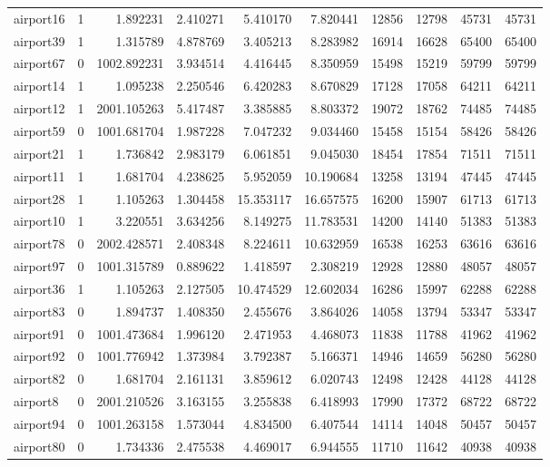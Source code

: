 \begin{longtable}{|l|r|r|r|r|r|r|r|r|r|}
airport16 & 1 & 1.892231 & 2.410271 & 5.410170 & 7.820441 & 12856 & 12798 & 45731 & 45731 \\
airport39 & 1 & 1.315789 & 4.878769 & 3.405213 & 8.283982 & 16914 & 16628 & 65400 & 65400 \\
airport67 & 0 & 1002.892231 & 3.934514 & 4.416445 & 8.350959 & 15498 & 15219 & 59799 & 59799 \\
airport14 & 1 & 1.095238 & 2.250546 & 6.420283 & 8.670829 & 17128 & 17058 & 64211 & 64211 \\
airport12 & 1 & 2001.105263 & 5.417487 & 3.385885 & 8.803372 & 19072 & 18762 & 74485 & 74485 \\
airport59 & 0 & 1001.681704 & 1.987228 & 7.047232 & 9.034460 & 15458 & 15154 & 58426 & 58426 \\
airport21 & 1 & 1.736842 & 2.983179 & 6.061851 & 9.045030 & 18454 & 17854 & 71511 & 71511 \\
airport11 & 1 & 1.681704 & 4.238625 & 5.952059 & 10.190684 & 13258 & 13194 & 47445 & 47445 \\
airport28 & 1 & 1.105263 & 1.304458 & 15.353117 & 16.657575 & 16200 & 15907 & 61713 & 61713 \\
airport10 & 1 & 3.220551 & 3.634256 & 8.149275 & 11.783531 & 14200 & 14140 & 51383 & 51383 \\
airport78 & 0 & 2002.428571 & 2.408348 & 8.224611 & 10.632959 & 16538 & 16253 & 63616 & 63616 \\
airport97 & 0 & 1001.315789 & 0.889622 & 1.418597 & 2.308219 & 12928 & 12880 & 48057 & 48057 \\
airport36 & 1 & 1.105263 & 2.127505 & 10.474529 & 12.602034 & 16286 & 15997 & 62288 & 62288 \\
airport83 & 0 & 1.894737 & 1.408350 & 2.455676 & 3.864026 & 14058 & 13794 & 53347 & 53347 \\
airport91 & 0 & 1001.473684 & 1.996120 & 2.471953 & 4.468073 & 11838 & 11788 & 41962 & 41962 \\
airport92 & 0 & 1001.776942 & 1.373984 & 3.792387 & 5.166371 & 14946 & 14659 & 56280 & 56280 \\
airport82 & 0 & 1.681704 & 2.161131 & 3.859612 & 6.020743 & 12498 & 12428 & 44128 & 44128 \\
airport8 & 0 & 2001.210526 & 3.163155 & 3.255838 & 6.418993 & 17990 & 17372 & 68722 & 68722 \\
airport94 & 0 & 1001.263158 & 1.573044 & 4.834500 & 6.407544 & 14114 & 14048 & 50457 & 50457 \\
airport80 & 0 & 1.734336 & 2.475538 & 4.469017 & 6.944555 & 11710 & 11642 & 40938 & 40938 \\

\end{longtable}
